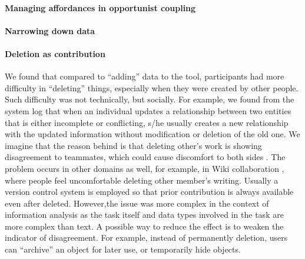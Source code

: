 \paragraph{Managing affordances in opportunist coupling}

\paragraph{Narrowing down data}

\paragraph{Deletion as contribution}

We found that compared to ``adding'' data to the tool, participants had more difficulty in ``deleting'' things, especially when they were created by other people. Such difficulty was not technically, but socially. For example, we found from the system log that when an individual updates a relationship between two entities that is either incomplete or conflicting, s/he usually creates a new relationship with the updated information without modification or deletion of the old one. We imagine that the reason behind is that deleting other's work is showing disagreement to teammates, which could cause discomfort to both sides \cite{Asch1951}. The problem occurs in other domains as well, for example, in Wiki collaboration \cite{grudin2010}, where people feel uncomfortable deleting other member's writing. Usually a version control system is employed so that prior contribution is always available even after deleted. However,the issue was more complex in the context of information analysis as the task itself and data types involved in the task are more complex than text. A possible way to reduce the effect is to weaken the indicator of disagreement. For example, instead of permanently deletion, users can ``archive'' an object for later use, or temporarily hide objects. 


